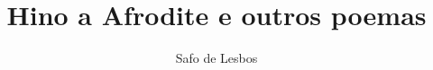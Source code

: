 \documentclass[12pt]{extarticle}
\begin{document}

\newcommand{\AutorLivro}{Safo de Lesbos}
\newcommand{\TituloLivro}{Hino a Afrodite e outros poemas}
\newcommand{\Tema}{Ficção, mistério e fantasia}
\newcommand{\Genero}{Poema}
\newcommand{\imagemCapa}{./images/PNLD0035-01.png}
\newcommand{\issnppub}{---}
\newcommand{\issnepub}{---}
\newcommand{\colaborador}{\textbf{Fulano de Tal} é uma pessoa incrível e vai fazer um bom serviço.}


\title{\TituloLivro}
\author{\AutorLivro}
\def\authornotes{\colaborador}

\date{}
\maketitle
\end{document}
